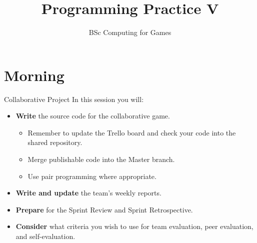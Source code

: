 \documentclass[xcolor={dvipsnames}]{beamer}\usepackage{etoolbox}\newtoggle{printable}\togglefalse{printable}
\begin{document}
\title{Programming Practice V}   
\subtitle{BSc Computing for Games}

\frame{\titlepage} 

\part{Morning}
\frame{\partpage}

\begin{frame}{Collaborative Project}
	In this session you will:
	
	\begin{itemize}
		\item \textbf{Write} the source code for the collaborative game.
		\begin{itemize}
			\item Remember to update the Trello board and check your code into the shared repository.
			\item Merge publishable code into the Master branch.
			\item Use pair programming where appropriate.
		\end{itemize}
		\item \textbf{Write and update} the team's weekly reports.
		\item\textbf{Prepare} for the Sprint Review and Sprint Retrospective.
		\item \textbf{Consider} what criteria you wish to use for team evaluation, peer evaluation, and self-evaluation.
	\end{itemize}
\end{frame}


%
\end{document}
